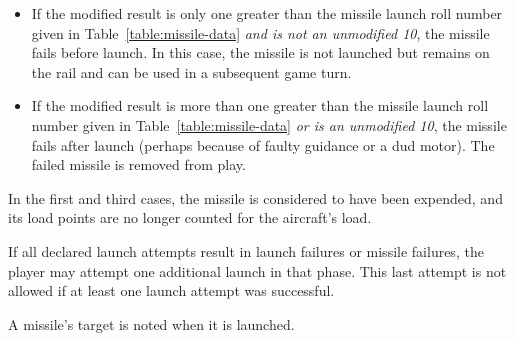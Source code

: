 {\begin{itemize}
    \item If the modified result is only one greater than the missile launch roll number given in Table~\ref{table:missile-data} \emph{and is not an unmodified 10}, the missile fails before launch.
    In this case, the missile is not launched but remains on the rail and can be used in a subsequent game turn.

    \item If the modified result is more than one greater than the missile launch roll number given in Table~\ref{table:missile-data} \emph{or is an unmodified 10}, the missile fails after launch (perhaps because of faulty guidance or a dud motor). The failed missile is removed from play.  


\end{itemize}

In the first and third cases, the missile is considered to have been expended, and its load points are no longer counted for the aircraft's load.

If all declared launch attempts result in launch failures or missile failures, the player may attempt one additional launch in that phase. This last attempt is not allowed if at least one launch attempt was successful. 

A missile's target is noted when it is launched.
}
